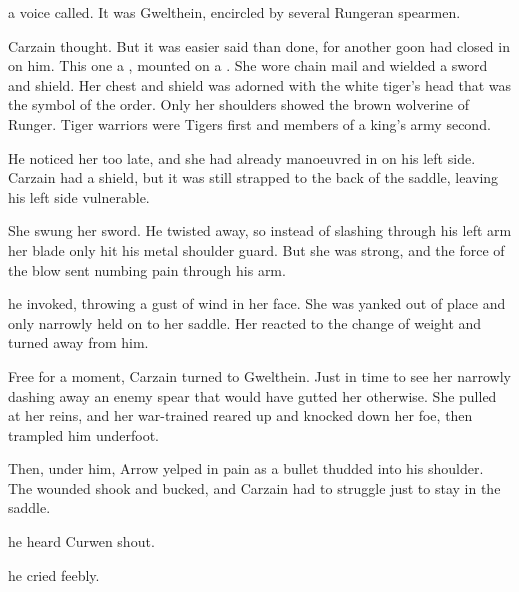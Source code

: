 \ta{\Shireyo!} a voice called. 
It was Gwelthein, encircled by several Rungeran spearmen. 

 Carzain thought. 
But it was easier said than done, for another goon had closed in on him. 
This one a \sphyle, mounted on a \relc. 
She wore chain mail and wielded a sword and shield. 
Her chest and shield was adorned with the white tiger's head that was the symbol of the  order. 
Only her shoulders showed the brown wolverine of Runger. 
Tiger warriors were Tigers first and members of a king's army second. 

He noticed her too late, and she had already manoeuvred in on his left side. 
Carzain had a shield, but it was still strapped to the back of the saddle, leaving his left side vulnerable. 

She swung her sword. 
He twisted away, so instead of slashing through his left arm her blade only hit his metal shoulder guard. 
But she was strong, and the force of the blow sent numbing pain through his arm. 

\ta{\Keshirah!} he invoked, throwing a gust of wind in her face. 
She was yanked out of place and only narrowly held on to her saddle. 
Her \relc{} reacted to the change of weight and turned away from him. 

Free for a moment, Carzain turned to Gwelthein. 
Just in time to see her narrowly dashing away an enemy spear that would have gutted her otherwise. 
She pulled at her reins, and her war-trained \relc{} reared up and knocked down her foe, then trampled him underfoot. 


Then, under him, Arrow yelped in pain as a bullet thudded into his shoulder. 
The wounded \relc{} shook and bucked, and Carzain had to struggle just to stay in the saddle. 

\ta{\Shireyo!} he heard Curwen shout.

 he cried feebly.

